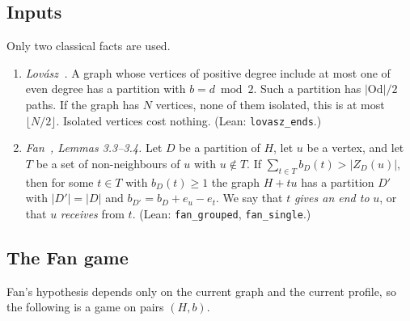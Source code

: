 \documentclass[11pt]{amsart}
\theoremstyle{definition}
\newcommand{\Od}{\mathrm{Od}}
\begin{document}
\subsection*{Inputs} Only two classical facts are used.
\begin{enumerate}[label=(\Alph*)]
\item \emph{Lov\'asz~\cite{L68}.} A graph whose vertices of positive degree include at most one
of even degree has a partition with $b=d\bmod 2$. Such a partition has $|\Od|/2$ paths. If the
graph has $N$ vertices, none of them isolated, this is at most $\lfloor N/2\rfloor$. Isolated
vertices cost nothing. (Lean: \texttt{lovasz\_ends}.)
\item \emph{Fan~\cite{Fan}, Lemmas 3.3--3.4.} Let $D$ be a partition of $H$, let $u$ be a vertex,
and let $T$ be a set of non-neighbours of $u$ with $u\notin T$. If
$\sum_{t\in T}b_D(t)>|Z_D(u)|$, then for some $t\in T$ with $b_D(t)\ge1$ the graph $H+tu$ has a
partition $D'$ with $|D'|=|D|$ and $b_{D'}=b_D+e_u-e_t$. We say that $t$ \emph{gives an end to}
$u$, or that $u$ \emph{receives} from $t$. (Lean: \texttt{fan\_grouped}, \texttt{fan\_single}.)
\end{enumerate}

\subsection*{The Fan game}\label{sec:game}
Fan's hypothesis depends only on the current graph and the current profile, so the following is
a game on pairs $(H,b)$.
\end{document}
